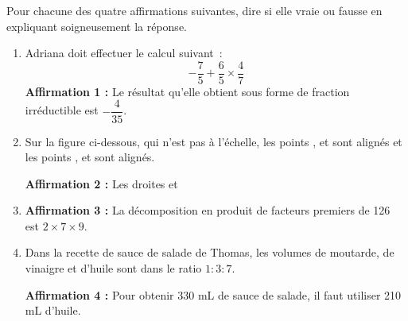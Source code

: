 \documentclass[exercice,a4]{thedocument}%
\begin{document}
%
Pour chacune des quatre affirmations suivantes, dire si elle vraie ou fausse en
expliquant soigneusement la réponse.
\begin{enumerate}
    \item Adriana doit effectuer le calcul suivant~:
    $$-\dfrac75+\dfrac65\times\dfrac47$$
    \noindent\textbf{Affirmation 1 :} Le résultat qu'elle obtient sous forme de
    fraction irréductible est $-\dfrac4{35}$.
    \item Sur la figure ci-dessous, qui n'est pas à l'échelle, les points
    ,  et  sont alignés et les points
    ,  et  sont alignés.
    \begin{center}
    \end{center}
    \noindent\textbf{Affirmation 2 :} Les droites  et
    \item \noindent\textbf{Affirmation 3 :} La décomposition en produit de
    facteurs premiers de 126 est $2\times 7\times 9$.
    \item Dans la recette de sauce de salade de Thomas, les volumes de
    moutarde, de vinaigre et d'huile sont dans le ratio $1:3:7$.\par
    \noindent\textbf{Affirmation 4 :} Pour obtenir 330 mL de sauce de salade,
    il faut utiliser 210 mL d'huile.
\end{enumerate}
\showthesource
\end{document}

